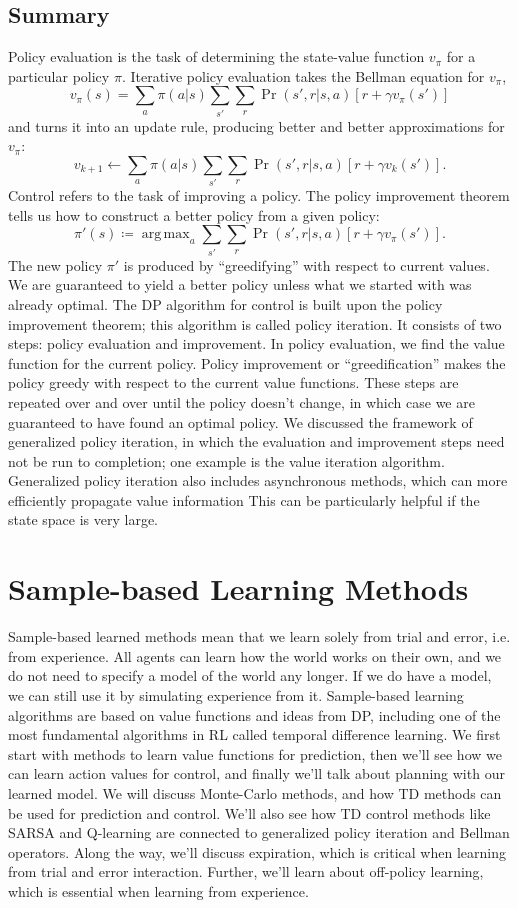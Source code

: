 \documentclass[12pt]{article}
\DeclareMathOperator*{\argmax}{arg\,max}
\begin{document}
\subsection{Summary}
Policy evaluation is the task of determining the state-value function $v_\pi$ for a particular policy $\pi$. Iterative policy evaluation takes the Bellman equation for $v_\pi$,
\[
  v_\pi(s) = \sum_a \pi(a|s) \sum_{s'} \sum_r \Pr(s',r|s,a)\left[r + \gamma v_\pi(s')\right]
\]
and turns it into an update rule, producing better and better approximations for $v_\pi$:
\[
  v_{k+1} \gets \sum_a \pi(a|s) \sum_{s'} \sum_r \Pr(s',r|s,a) \left[ r + \gamma v_k(s')\right].
\]
Control refers to the task of improving a policy. The policy improvement theorem tells us how to construct a better policy from a given policy:
\[
  \pi'(s) \coloneqq \argmax_a \sum_{s'} \sum_r \Pr(s',r|s,a) \left[ r + \gamma v_\pi(s')\right].
\]
The new policy $\pi'$ is produced by ``greedifying'' with respect to current values. We are guaranteed to yield a better policy unless what we started with was already optimal. The DP algorithm for control is built upon the policy improvement theorem; this algorithm is called policy iteration. It consists of two steps: policy evaluation and improvement. In policy evaluation, we find the value function for the current policy. Policy improvement or ``greedification'' makes the policy greedy with respect to the current value functions. These steps are repeated over and over until the policy doesn't change, in which case we are guaranteed to have found an optimal policy. We discussed the framework of generalized policy iteration, in which the evaluation and improvement steps need not be run to completion; one example is the value iteration algorithm. Generalized policy iteration also includes asynchronous methods, which can more efficiently propagate value information This can be particularly helpful if the state space is very large.

\section{Sample-based Learning Methods}
Sample-based learned methods mean that we learn solely from trial and error, i.e. from experience. All agents can learn how the world works on their own, and we do not need to specify a model of the world any longer. If we do have a model, we can still use it by simulating experience from it. Sample-based learning algorithms are based on value functions and ideas from DP, including one of the most fundamental algorithms in RL called temporal difference learning. We first start with methods to learn value functions for prediction, then we'll see how we can learn action values for control, and finally we'll talk about planning with our learned model. We will discuss Monte-Carlo methods, and how TD methods can be used for prediction and control. We'll also see how TD control methods like SARSA and Q-learning are connected to generalized policy iteration and Bellman operators. Along the way, we'll discuss expiration, which is critical when learning from trial and error interaction. Further, we'll learn about off-policy learning, which is essential when learning from experience.
\end{document}
